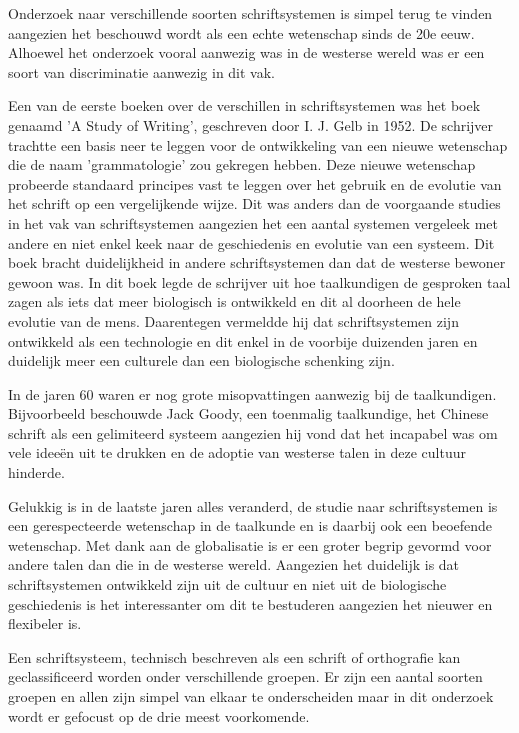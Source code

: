 Onderzoek naar verschillende soorten schriftsystemen is simpel terug te vinden aangezien het beschouwd wordt als een echte wetenschap sinds de 20e eeuw.
Alhoewel het onderzoek vooral aanwezig was in de westerse wereld was er een soort van discriminatie aanwezig in dit vak.

Een van de eerste boeken over de verschillen in schriftsystemen was het boek genaamd 'A Study of Writing', geschreven door I. J. Gelb in 1952. \autocite{Gelb1952}
De schrijver trachtte een basis neer te leggen voor de ontwikkeling van een nieuwe wetenschap die de naam 'grammatologie' zou gekregen hebben.
Deze nieuwe wetenschap probeerde standaard principes vast te leggen over het gebruik en de evolutie van het schrift op een vergelijkende wijze.
Dit was anders dan de voorgaande studies in het vak van schriftsystemen aangezien het een aantal systemen vergeleek met andere en niet enkel keek naar de geschiedenis en evolutie van een systeem.
Dit boek bracht duidelijkheid in andere schriftsystemen dan dat de westerse bewoner gewoon was. 
In dit boek legde de schrijver uit hoe taalkundigen de gesproken taal zagen als iets dat meer biologisch is ontwikkeld en dit al doorheen de hele evolutie van de mens.
Daarentegen vermeldde hij dat schriftsystemen zijn ontwikkeld als een technologie en dit enkel in de voorbije duizenden jaren en duidelijk meer een culturele dan een biologische schenking zijn.

In de jaren 60 waren er nog grote misopvattingen aanwezig bij de taalkundigen.
Bijvoorbeeld beschouwde Jack Goody, een toenmalig taalkundige,  het Chinese schrift als een gelimiteerd systeem aangezien hij vond dat het incapabel was om vele ideeën uit te drukken en de adoptie van westerse talen in deze cultuur hinderde.

Gelukkig is in de laatste jaren alles veranderd, de studie naar schriftsystemen is een gerespecteerde wetenschap in de taalkunde en is daarbij ook een beoefende wetenschap. 
Met dank aan de globalisatie is er een groter begrip gevormd voor andere talen dan die in de westerse wereld.
Aangezien het duidelijk is dat schriftsystemen ontwikkeld zijn uit de cultuur en niet uit de biologische geschiedenis is het interessanter om dit te bestuderen aangezien het nieuwer en flexibeler is.

Een schriftsysteem, technisch beschreven als een schrift of orthografie kan geclassificeerd worden onder verschillende groepen.  \autocite{David} \autocite{Allan2015}
Er zijn een aantal soorten groepen en allen zijn simpel van elkaar te onderscheiden maar in dit onderzoek wordt er gefocust op de drie meest voorkomende.

